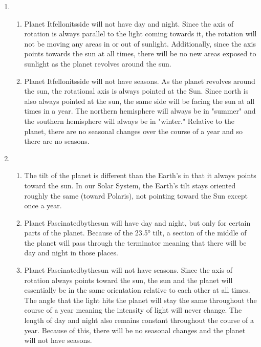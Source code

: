 \documentclass[../hw1.tex]{subfiles}
\begin{document}
    \begin{enumerate}
        \item \begin{enumerate}
            \item Planet Itfellonitsside will not have day and night. Since the axis of rotation is always parallel to the light coming towards it, the rotation will not be moving any areas in or out of sunlight. Additionally, since the axis points towards the sun at all times, there will be no new areas exposed to sunlight as the planet revolves around the sun.
            \item Planet Itfellonitsside will not have seasons. As the planet revolves around the sun, the rotational axis is always pointed at the Sun. Since north is also always pointed at the sun, the same side will be facing the sun at all times in a year. The northern hemisphere will always be in "summer" and the southern hemisphere will always be in "winter." Relative to the planet, there are no seasonal changes over the course of a year and so there are no seasons.
        \end{enumerate}
        \item \begin{enumerate}
            \item The tilt of the planet is different than the Earth's in that it always points toward the sun. In our Solar System, the Earth's tilt stays oriented roughly the same (toward Polaris), not pointing toward the Sun except once a year.
            \item Planet Fascinatedbythesun will have day and night, but only for certain parts of the planet. Because of the \ang{23.5} tilt, a section of the middle of the planet will pass through the terminator meaning that there will be day and night in those places.
            \item Planet Fascinatedbythesun will not have seasons. Since the axis of rotation always points toward the sun, the sun and the planet will essentially be in the same orientation relative to each other at all times. The angle that the light hits the planet will stay the same throughout the course of a year meaning the intensity of light will never change. The length of day and night also remains constant throughout the course of a year. Because of this, there will be no seasonal changes and the planet will not have seasons.
        \end{enumerate}
    \end{enumerate}
\end{document}
